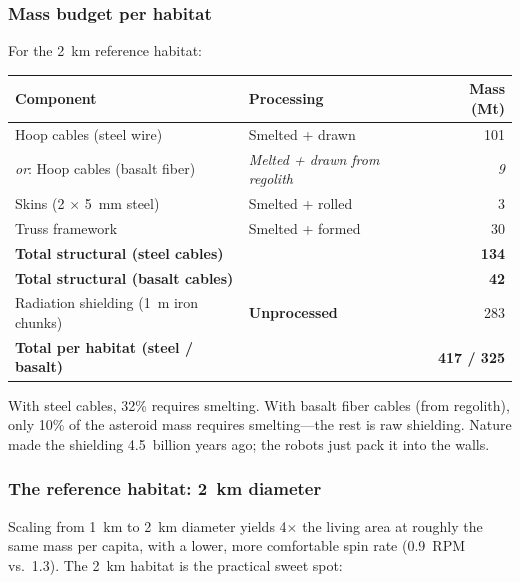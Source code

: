 \documentclass[12pt,letterpaper]{article}
\begin{document}
\subsubsection{Mass budget per habitat}

For the 2~km reference habitat:

\begin{center}
\small
\begin{tabular}{llr}
\toprule
\textbf{Component} & \textbf{Processing} & \textbf{Mass (Mt)} \\
\midrule
Hoop cables (steel wire) & Smelted + drawn & 101 \\
\quad \emph{or}: Hoop cables (basalt fiber) & \emph{Melted + drawn from regolith} & \emph{9} \\
Skins (2 $\times$ 5~mm steel) & Smelted + rolled & 3 \\
Truss framework & Smelted + formed & 30 \\
\midrule
\textbf{Total structural (steel cables)} & & \textbf{134} \\
\textbf{Total structural (basalt cables)} & & \textbf{42} \\
\midrule
Radiation shielding (1~m iron chunks) & \textbf{Unprocessed} & 283 \\
\midrule
\textbf{Total per habitat (steel / basalt)} & & \textbf{417 / 325} \\
\bottomrule
\end{tabular}
\end{center}

With steel cables, 32\% requires smelting. With basalt fiber cables (from regolith), only 10\% of the asteroid mass requires smelting---the rest is raw shielding. Nature made the shielding 4.5~billion years ago; the robots just pack it into the walls.

\subsubsection{The reference habitat: 2~km diameter}

Scaling from 1~km to 2~km diameter yields 4$\times$ the living area at roughly the same mass per capita, with a lower, more comfortable spin rate (0.9~RPM vs.\ 1.3). The 2~km habitat is the practical sweet spot:
\end{document}
